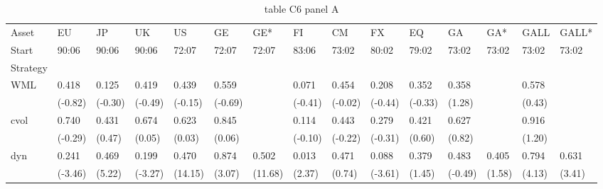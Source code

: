 \begin{table}[htbp]
  \centering
  \caption{table C6 panel A}
  \label{tab:table_C6_panel_A}
  \begin{tabular}{lllllllllllllll}
\toprule
Asset & EU & JP & UK & US & GE & GE* & FI & CM & FX & EQ & GA & GA* & GALL & GALL* \\
Start & 90:06 & 90:06 & 90:06 & 72:07 & 72:07 & 72:07 & 83:06 & 73:02 & 80:02 & 79:02 & 73:02 & 73:02 & 73:02 & 73:02 \\
Strategy &  &  &  &  &  &  &  &  &  &  &  &  &  &  \\
\midrule
WML & 0.418 & 0.125 & 0.419 & 0.439 & 0.559 &  & 0.071 & 0.454 & 0.208 & 0.352 & 0.358 &  & 0.578 &  \\
 & (-0.82) & (-0.30) & (-0.49) & (-0.15) & (-0.69) &  & (-0.41) & (-0.02) & (-0.44) & (-0.33) & (1.28) &  & (0.43) &  \\
cvol & 0.740 & 0.431 & 0.674 & 0.623 & 0.845 &  & 0.114 & 0.443 & 0.279 & 0.421 & 0.627 &  & 0.916 &  \\
 & (-0.29) & (0.47) & (0.05) & (0.03) & (0.06) &  & (-0.10) & (-0.22) & (-0.31) & (0.60) & (0.82) &  & (1.20) &  \\
dyn & 0.241 & 0.469 & 0.199 & 0.470 & 0.874 & 0.502 & 0.013 & 0.471 & 0.088 & 0.379 & 0.483 & 0.405 & 0.794 & 0.631 \\
 & (-3.46) & (5.22) & (-3.27) & (14.15) & (3.07) & (11.68) & (2.37) & (0.74) & (-3.61) & (1.45) & (-0.49) & (1.58) & (4.13) & (3.41) \\
\bottomrule
\end{tabular}

\end{table}
